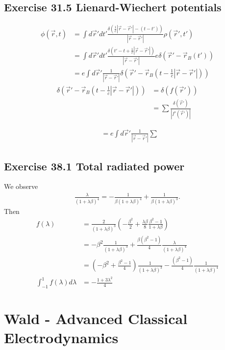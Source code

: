 \documentclass[10pt,a4paper]{book}
\theoremstyle{definition}
\begin{document}
\subsection{Exercise 31.5 Lienard-Wiechert potentials}
\begin{align}
\phi(\vec{r},t)&=\int d\vec{r}'dt'\frac{\delta(\frac{1}{c}|\vec{r}-\vec{r}'|-(t-t'))}{|\vec{r}-\vec{r}'|}\rho(\vec{r}',t')\\
&=\int d\vec{r}'dt'\frac{\delta(t'-t+\frac{1}{c}|\vec{r}-\vec{r}'|)}{|\vec{r}-\vec{r}'|}e\delta(\vec{r}'-\vec{r}_B(t'))\\
&=e\int d\vec{r}'\frac{1}{|\vec{r}-\vec{r}'|}\delta(\vec{r}'-\vec{r}_B(t-\frac{1}{c}|\vec{r}-\vec{r}'|))
\end{align}
\begin{align}
\delta(\vec{r}'-\vec{r}_B(t-\frac{1}{c}|\vec{r}-\vec{r}'|))&=\delta(f(\vec{r}'))\\
&=\sum\frac{\delta(\vec{r}')}{|f'(\vec{r}')|}
\end{align}

\begin{align}
&=e\int d\vec{r}'\frac{1}{|\vec{r}-\vec{r}'|}\sum\frac{}{}
\end{align}


\subsection{Exercise 38.1 Total radiated power}
We observe
\begin{align}
\frac{\lambda}{(1+\lambda\beta)^4}=-\frac{1}{\beta(1+\lambda\beta)^4}+\frac{1}{\beta(1+\lambda\beta)^3}.    
\end{align}
Then
\begin{align}
    f(\lambda)&=\frac{2}{(1+\lambda\beta)^3}\left(-\frac{\beta^2}{2}+\frac{\lambda\beta}{8}\frac{\beta^2-1}{1+\lambda\beta}\right)\\
    &=-\beta^2\frac{1}{(1+\lambda\beta)^3}+\frac{\beta(\beta^2-1)}{4}\frac{\lambda}{(1+\lambda\beta)^4}\\
    &=\left(-\beta^2+\frac{\beta^2-1}{4}\right)\frac{1}{(1+\lambda\beta)^3}-\frac{(\beta^2-1)}{4}\frac{1}{(1+\lambda\beta)^4}\\
    \int_{-1}^1f(\lambda)d\lambda&=-\frac{1+3\lambda^2}{4}
\end{align}

\section{{\sc Wald} - Advanced Classical Electrodynamics}
\end{document}
